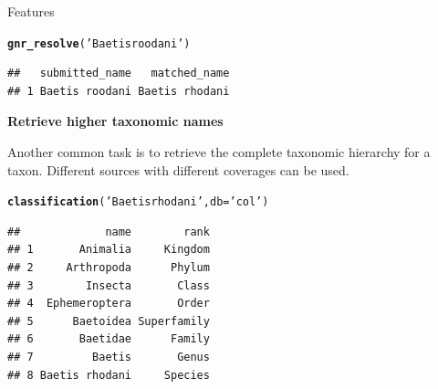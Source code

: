 \documentclass[final,t]{beamer}\usepackage[]{graphicx}\usepackage[]{color}
\makeatletter
\newcommand{\hlstr}[1]{\textcolor[rgb]{0.192,0.494,0.8}{#1}}%
\newcommand{\hlstd}[1]{\textcolor[rgb]{0.345,0.345,0.345}{#1}}%
\newcommand{\hlkwc}[1]{\textcolor[rgb]{0.333,0.667,0.333}{#1}}%
\newcommand{\hlkwd}[1]{\textcolor[rgb]{0.737,0.353,0.396}{\textbf{#1}}}%
\newenvironment{kframe}{%
 \def\at@end@of@kframe{}%
 \ifinner\ifhmode%
  \def\at@end@of@kframe{\end{minipage}}%
  \begin{minipage}{\columnwidth}%
 \fi\fi%
 \def\FrameCommand##1{\hskip\@totalleftmargin \hskip-\fboxsep
 \colorbox{shadecolor}{##1}\hskip-\fboxsep
     \hskip-\linewidth \hskip-\@totalleftmargin \hskip\columnwidth}%
 \MakeFramed {\advance\hsize-\width
   \@totalleftmargin\z@ \linewidth\hsize
   \@setminipage}}%
 {\par\unskip\endMakeFramed%
 \at@end@of@kframe}
\newenvironment{knitrout}{}{} %
\renewenvironment{knitrout}{}{\vspace{-1.8em}}
\makeatother
\begin{document}
\begin{frame}[fragile]
\begin{columns}[t]
\begin{column}{.49\linewidth}
\begin{block}{Features}
\begin{knitrout}\footnotesize
{}\color{fgcolor}\begin{kframe}
\begin{alltt}
\hlkwd{gnr_resolve}\hlstd{(}\hlstr{'Baetis roodani'}\hlstd{)}
\end{alltt}
\end{kframe}
\end{knitrout}
\begin{knitrout}\footnotesize
{}\color{fgcolor}\begin{kframe}
\begin{verbatim}
##   submitted_name   matched_name
## 1 Baetis roodani Baetis rhodani
\end{verbatim}
\end{kframe}
\end{knitrout}
\vspace{2em}
					
\textcolor{i6bluedark}{\textbf{\large Retrieve higher taxonomic names}} 
        \vspace{0.5em}
        \par
        \begingroup
        \leftskip=2cm
        \noindent 
          Another common task is to retrieve the complete taxonomic hierarchy for a taxon.
          Different sources with different coverages can be used.
        \par
        \endgroup

\begin{knitrout}\footnotesize
{}\color{fgcolor}\begin{kframe}
\begin{alltt}
\hlkwd{classification}\hlstd{(}\hlstr{'Baetis rhodani'}\hlstd{,} \hlkwc{db} \hlstd{=} \hlstr{'col'}\hlstd{)}
\end{alltt}
\end{kframe}
\end{knitrout}
\begin{knitrout}\footnotesize
{}\color{fgcolor}\begin{kframe}
\begin{verbatim}
##             name        rank
## 1       Animalia     Kingdom
## 2     Arthropoda      Phylum
## 3        Insecta       Class
## 4  Ephemeroptera       Order
## 5      Baetoidea Superfamily
## 6       Baetidae      Family
## 7         Baetis       Genus
## 8 Baetis rhodani     Species
\end{verbatim}
\end{kframe}
\end{knitrout}
\vspace{2em}


\end{block}
\end{column}
\end{columns}
\end{frame}
\end{document}
